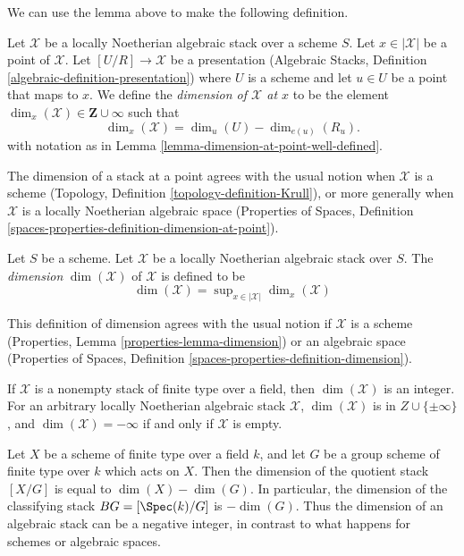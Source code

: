 \noindent
We can use the lemma above to make the following definition.

\begin{definition}
\label{definition-dimension-at-point}
Let $\mathcal{X}$ be a locally Noetherian algebraic stack over a scheme $S$.
Let $x \in |\mathcal{X}|$ be a point of $\mathcal{X}$.
Let $[U/R] \to \mathcal{X}$ be a presentation
(Algebraic Stacks, Definition \ref{algebraic-definition-presentation})
where $U$ is a scheme
and let $u \in U$ be a point that maps to $x$.
We define the {\it dimension of $\mathcal{X}$ at $x$} to be
the element $\dim_x(\mathcal{X}) \in \mathbf{Z} \cup \infty$
such that 
$$
\dim_x(\mathcal{X}) = \dim_u(U)-\dim_{e(u)}(R_u).
$$
with notation as in Lemma \ref{lemma-dimension-at-point-well-defined}.
\end{definition}

\noindent
The dimension of a stack at a point agrees with the usual notion
when $\mathcal{X}$ is a scheme (Topology, Definition
\ref{topology-definition-Krull}),
or more generally when $\mathcal{X}$ is a locally Noetherian algebraic space
(Properties of Spaces, Definition
\ref{spaces-properties-definition-dimension-at-point}).

\begin{definition}
\label{definition-dimension}
Let $S$ be a scheme. Let $\mathcal{X}$ be
a locally Noetherian algebraic stack over $S$.
The {\it dimension} $\dim(\mathcal{X})$ of $\mathcal{X}$ is defined to be
$$
\dim(\mathcal{X}) = \sup\nolimits_{x \in |\mathcal{X}|} \dim_x(\mathcal{X})
$$
\end{definition}

\noindent
This definition of dimension agrees with the usual notion
if $\mathcal{X}$ is a scheme
(Properties, Lemma \ref{properties-lemma-dimension})
or an algebraic space (Properties of Spaces, Definition
\ref{spaces-properties-definition-dimension}).

\begin{remark}
\label{remark-dimension-empty-stack}
If $\mathcal{X}$ is a nonempty stack of finite type over a field,
then $\dim(\mathcal{X})$ is an integer. For an arbitrary
locally Noetherian algebraic stack $\mathcal{X}$,
$\dim(\mathcal{X})$ is in $Z\cup \{\pm \infty\}$,
and $\dim(\mathcal{X}) = -\infty$ if and only if $\mathcal{X}$
is empty.
\end{remark}

\begin{example}
\label{example-dimension-quotient-stack}
Let $X$ be a scheme of finite type over a field $k$, and let $G$
be a group scheme of finite type over $k$ which acts on $X$.
Then the dimension of the quotient stack $[X/G]$ is equal to
$\dim(X)-\dim(G)$. In particular, the dimension of the classifying
stack $BG=[\Spec(k)/G]$ is $-\dim(G)$. Thus the dimension of an algebraic
stack can be a negative integer, in contrast to what happens for schemes
or algebraic spaces.
\end{example}






